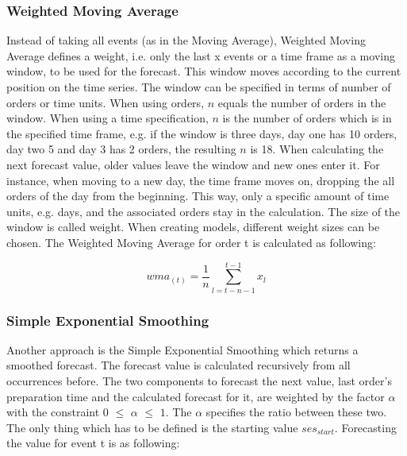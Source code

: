 \subsubsection{Weighted Moving Average}\label{subsubsection:Weighted Moving Average}
Instead of taking all events (as in the Moving Average), Weighted Moving Average defines a weight, i.e. only the last x events or a time frame  as a moving window, to be used for the forecast. This window moves according to the current position on the time series. The window can be specified in terms of number of orders or time units. When using orders, $n$ equals the number of orders in the window. When using a time specification, $n$ is the number of orders which is in the specified time frame, e.g. if the window is three days, day one has 10 orders, day two 5 and day 3 has 2 orders, the resulting $n$ is 18. When calculating the next forecast value, older values leave the window and new ones enter it. For instance, when moving to a new day, the time frame moves on, dropping the all orders of the day from the beginning. This way, only a specific amount of time units, e.g. days, and the associated orders stay in the calculation. The size of the window is called weight. When creating models, different weight sizes can be chosen.\newline
The Weighted Moving Average for order t is calculated as following:

\begin{center}
\begin{equation}
wma_{(t)}= \frac{1}{n}\sum^{t-1}_{l = t-n-1} x_{l}
\end{equation}
\end{center}

\subsubsection{Simple Exponential Smoothing}\label{subsubsection:Simple Exponential Smoothing}
Another approach is the Simple Exponential Smoothing which returns a smoothed forecast. The forecast value is calculated recursively from all occurrences before. The two components to forecast the next value, last order's preparation time and the calculated forecast for it, are weighted by the factor $\alpha$ with the constraint $0$ $\le$ $\alpha$ $\le$ $1$. The $\alpha$ specifies the ratio between these two. The only thing which has to be defined is the starting value $ses_{start}$.\newline
Forecasting the value for event t is as following:

